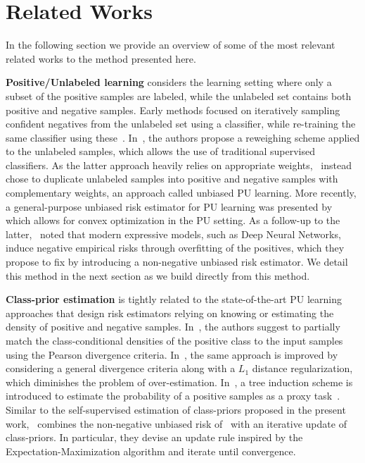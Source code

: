 \section{Related Works}
\label{sec:rel_works}


In the following section we provide an overview of some of the most relevant related works to the method presented here.

\textbf{Positive/Unlabeled learning} considers the learning setting where only a subset of the positive samples are labeled, while the unlabeled set contains both positive and negative samples.
Early methods focused on iteratively sampling confident negatives from the unlabeled set using a classifier, while re-training the same classifier using these~\cite{li03,liu03,li05}.
In~\cite{lee03}, the authors propose a reweighing scheme applied to the unlabeled samples, which allows the use of traditional supervised classifiers.
As the latter approach heavily relies on appropriate weights,~\cite{elkan08} instead chose to duplicate unlabeled samples into positive and negative samples with complementary weights, an approach called unbiased PU learning. More recently, a general-purpose unbiased risk estimator for PU learning was presented by~\cite{duplessis15} which allows for convex optimization in the PU setting. As a follow-up to the latter,~\cite{kiryo17} noted that modern expressive models, such as Deep Neural Networks, induce negative empirical risks through overfitting of the positives, which they propose to fix by introducing a non-negative unbiased risk estimator. We detail this method in the next section as we build directly from this method.

\textbf{Class-prior estimation} is tightly related to the state-of-the-art PU learning approaches that design risk estimators relying on knowing or estimating the density of positive and negative samples. In~\cite{duplessis14}, the authors suggest to partially match the class-conditional densities of the positive class to the input samples using the Pearson divergence criteria. In~\cite{christoffel16}, the same approach is improved by considering a general divergence criteria along with a $L_{1}$ distance regularization, which diminishes the problem of over-estimation. In~\cite{bekker18}, a tree induction scheme is introduced to estimate the probability of a positive samples as a proxy task~\cite{scott09}. Similar to the self-supervised estimation of class-priors proposed in the present work,~\cite{kato18} combines the non-negative unbiased risk of~\cite{kiryo17} with an iterative update of class-priors. In particular, they devise an update rule inspired by the Expectation-Maximization algorithm and iterate until convergence.


